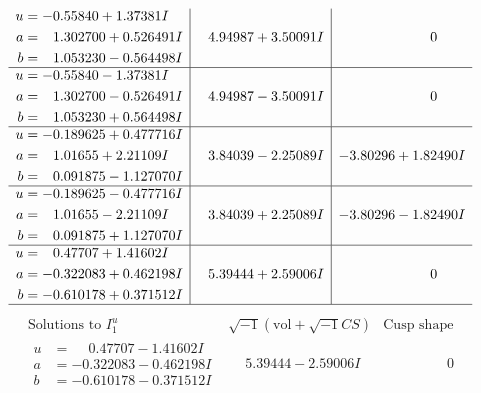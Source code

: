 \documentclass[1p]{elsarticle_modified}
\theoremstyle{definition}
\newcommand{\I}{\sqrt{-1}}
\begin{document}
$$\begin{array}{c|c|c}
\begin{aligned}
u &= -0.55840 + 1.37381 I \\
a &= \phantom{-}1.302700 + 0.526491 I \\
b &= \phantom{-}1.053230 - 0.564498 I\end{aligned}
 & \phantom{-}4.94987 + 3.50091 I & \phantom{-0.000000 } 0 \\ \hline\begin{aligned}
u &= -0.55840 - 1.37381 I \\
a &= \phantom{-}1.302700 - 0.526491 I \\
b &= \phantom{-}1.053230 + 0.564498 I\end{aligned}
 & \phantom{-}4.94987 - 3.50091 I & \phantom{-0.000000 } 0 \\ \hline\begin{aligned}
u &= -0.189625 + 0.477716 I \\
a &= \phantom{-}1.01655 + 2.21109 I \\
b &= \phantom{-}0.091875 - 1.127070 I\end{aligned}
 & \phantom{-}3.84039 - 2.25089 I & -3.80296 + 1.82490 I \\ \hline\begin{aligned}
u &= -0.189625 - 0.477716 I \\
a &= \phantom{-}1.01655 - 2.21109 I \\
b &= \phantom{-}0.091875 + 1.127070 I\end{aligned}
 & \phantom{-}3.84039 + 2.25089 I & -3.80296 - 1.82490 I \\ \hline\begin{aligned}
u &= \phantom{-}0.47707 + 1.41602 I \\
a &= -0.322083 + 0.462198 I \\
b &= -0.610178 + 0.371512 I\end{aligned}
 & \phantom{-}5.39444 + 2.59006 I & \phantom{-0.000000 } 0\\
 \hline 
 \end{array}$$\newpage$$\begin{array}{c|c|c}  
\text{Solutions to }I^u_{1}& \I (\text{vol} + \sqrt{-1}CS) & \text{Cusp shape}\\
 \hline 
\begin{aligned}
u &= \phantom{-}0.47707 - 1.41602 I \\
a &= -0.322083 - 0.462198 I \\
b &= -0.610178 - 0.371512 I\end{aligned}
 & \phantom{-}5.39444 - 2.59006 I & \phantom{-0.000000 } 0 \\ \hline\begin{aligned}

\end{aligned}
\end{array}$$
\end{document}
